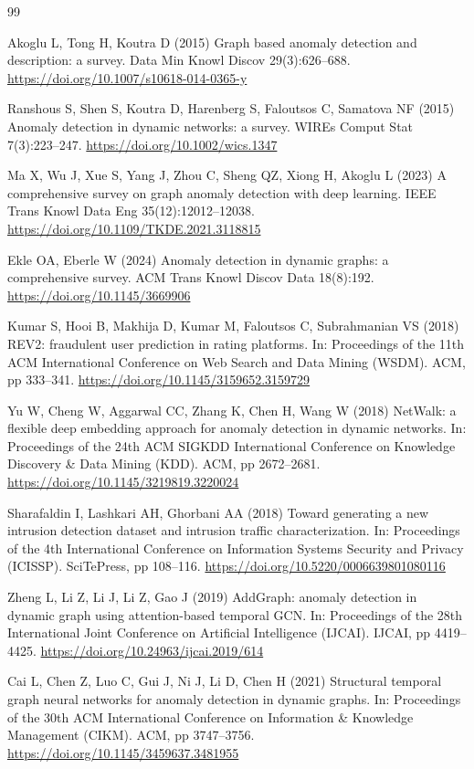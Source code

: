 \documentclass[pdflatex,sn-basic]{sn-jnl}
\theoremstyle{definition}
\theoremstyle{plain}
\begin{document}
\begin{thebibliography}{99}

Akoglu L, Tong H, Koutra D (2015) Graph based anomaly detection and description: a survey. Data Min Knowl Discov 29(3):626--688. \url{https://doi.org/10.1007/s10618-014-0365-y}

Ranshous S, Shen S, Koutra D, Harenberg S, Faloutsos C, Samatova NF (2015) Anomaly detection in dynamic networks: a survey. WIREs Comput Stat 7(3):223--247. \url{https://doi.org/10.1002/wics.1347}

Ma X, Wu J, Xue S, Yang J, Zhou C, Sheng QZ, Xiong H, Akoglu L (2023) A comprehensive survey on graph anomaly detection with deep learning. IEEE Trans Knowl Data Eng 35(12):12012--12038. \url{https://doi.org/10.1109/TKDE.2021.3118815}

Ekle OA, Eberle W (2024) Anomaly detection in dynamic graphs: a comprehensive survey. ACM Trans Knowl Discov Data 18(8):192. \url{https://doi.org/10.1145/3669906}

Kumar S, Hooi B, Makhija D, Kumar M, Faloutsos C, Subrahmanian VS (2018) REV2: fraudulent user prediction in rating platforms. In: Proceedings of the 11th ACM International Conference on Web Search and Data Mining (WSDM). ACM, pp 333--341. \url{https://doi.org/10.1145/3159652.3159729}

Yu W, Cheng W, Aggarwal CC, Zhang K, Chen H, Wang W (2018) NetWalk: a flexible deep embedding approach for anomaly detection in dynamic networks. In: Proceedings of the 24th ACM SIGKDD International Conference on Knowledge Discovery \& Data Mining (KDD). ACM, pp 2672--2681. \url{https://doi.org/10.1145/3219819.3220024}

Sharafaldin I, Lashkari AH, Ghorbani AA (2018) Toward generating a new intrusion detection dataset and intrusion traffic characterization. In: Proceedings of the 4th International Conference on Information Systems Security and Privacy (ICISSP). SciTePress, pp 108--116. \url{https://doi.org/10.5220/0006639801080116}

Zheng L, Li Z, Li J, Li Z, Gao J (2019) AddGraph: anomaly detection in dynamic graph using attention-based temporal GCN. In: Proceedings of the 28th International Joint Conference on Artificial Intelligence (IJCAI). IJCAI, pp 4419--4425. \url{https://doi.org/10.24963/ijcai.2019/614}

Cai L, Chen Z, Luo C, Gui J, Ni J, Li D, Chen H (2021) Structural temporal graph neural networks for anomaly detection in dynamic graphs. In: Proceedings of the 30th ACM International Conference on Information \& Knowledge Management (CIKM). ACM, pp 3747--3756. \url{https://doi.org/10.1145/3459637.3481955}


\end{thebibliography}
\end{document}

